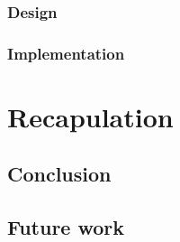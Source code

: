     \subsection{Design}
    \subsection{Implementation}

\chapter{Recapulation}
  \section{Conclusion}
  \section{Future work}

\appendix


